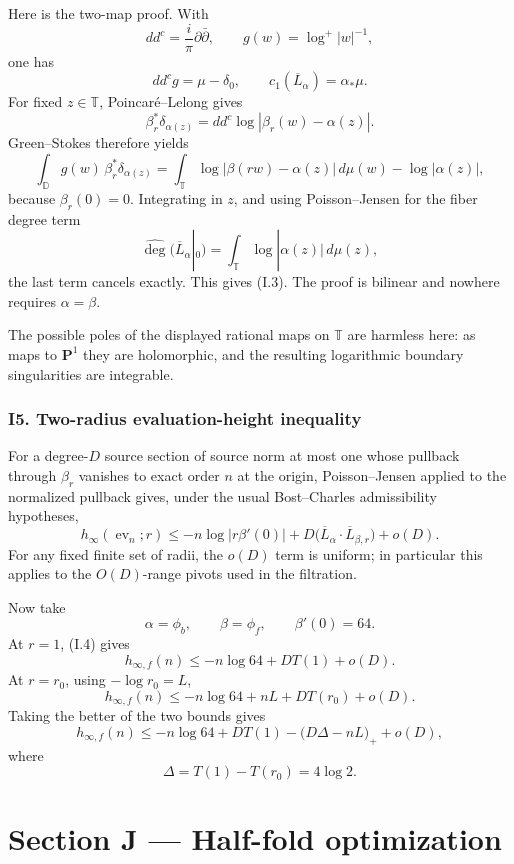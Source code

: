 \documentclass[
  10pt,
  letterpaper,
]{article}
\theoremstyle{definition}
\theoremstyle{remark}
\begin{document}
Here is the two-map proof. With \[
dd^c=\frac{i}{\pi}\partial\bar\partial,
\qquad
g(w)=\log^+|w|^{-1},
\] one has \[
dd^c g=\mu-\delta_0,
\qquad
c_1(\overline L_\alpha)=\alpha_*\mu.
\] For fixed \(z\in\mathbb T\), Poincaré--Lelong gives \[
\beta_r^*\delta_{\alpha(z)}
=dd^c\log|\beta_r(w)-\alpha(z)|.
\] Green--Stokes therefore yields \[
\int_{\mathbb D}g(w)\,\beta_r^*\delta_{\alpha(z)}
=
\int_{\mathbb T}\log|\beta(rw)-\alpha(z)|\,d\mu(w)
-\log|\alpha(z)|,
\] because \(\beta_r(0)=0\). Integrating in \(z\), and using
Poisson--Jensen for the fiber degree term \[
\widehat{\deg}(\overline L_\alpha|_{0})
=\int_{\mathbb T}\log|\alpha(z)|\,d\mu(z),
\] the last term cancels exactly. This gives (I.3). The proof is
bilinear and nowhere requires \(\alpha=\beta\).

The possible poles of the displayed rational maps on \(\mathbb T\) are
harmless here: as maps to \(\mathbf P^1\) they are holomorphic, and the
resulting logarithmic boundary singularities are integrable.

\subsubsection{I5. Two-radius evaluation-height
inequality}\label{i5.-two-radius-evaluation-height-inequality}

For a degree-\(D\) source section of source norm at most one whose
pullback through \(\beta_r\) vanishes to exact order \(n\) at the
origin, Poisson--Jensen applied to the normalized pullback gives, under
the usual Bost--Charles admissibility hypotheses, \[
\boxed{
h_\infty(\operatorname{ev}_n;r)
\le
-n\log|r\beta'(0)|
+D\bigl(\overline L_\alpha\cdot\overline L_{\beta,r}\bigr)
+o(D).
}
\tag{I.4}
\] For any fixed finite set of radii, the \(o(D)\) term is uniform; in
particular this applies to the \(O(D)\)-range pivots used in the
filtration.

Now take \[
\alpha=\phi_b,\qquad \beta=\phi_f,
\qquad \beta'(0)=64.
\] At \(r=1\), (I.4) gives \[
h_{\infty,f}(n)
\le -n\log64+DT(1)+o(D).
\] At \(r=r_0\), using \(-\log r_0=L\), \[
h_{\infty,f}(n)
\le -n\log64+nL+DT(r_0)+o(D).
\] Taking the better of the two bounds gives \[
\boxed{
h_{\infty,f}(n)
\le
-n\log64
+DT(1)
-\bigl(D\Delta-nL\bigr)_+
+o(D),
}
\] where \[
\Delta=T(1)-T(r_0)=4\log2.
\]

\section{Section J --- Half-fold
optimization}\label{section-j-half-fold-optimization}
\end{document}
